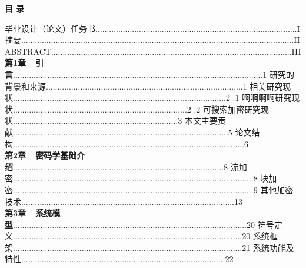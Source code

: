 \documentclass[a4paper,12pt,UTF8]{ctexart}
\begin{document}
\begin{spacing}{1.1}
\clearpage{}  %
%
\begin{center}
\Large\textbf{目  录}
\end{center}
\normalsize
\begin{spacing}{1.45}
\justifying  
\noindent 毕业设计（论文）任务书........................................................................................I
\\摘要.......................................................................................................................II
\\ABSTRACT.........................................................................................................III
\\\textbf{第1章\ \ 引  言}.............................................................................................................1
 研究的背景和来源......................................................................................1
 相关研究现状.............................................................................................2
\indent{}.1 啊啊啊啊研究现状............................................................................2
\indent{}.2 可搜索加密研究现状........................................................................3
 本文主要贡献..............................................................................................5
 论文结构.....................................................................................................6
\\\textbf{第2章\ \ 密码学基础介绍}............................................................................................8
 流加密.........................................................................................................8
 块加密.........................................................................................................9
 其他加密技术.............................................................................................13
 \\\textbf{第3章\ \ 系统模型}......................................................................................................20
 符号定义....................................................................................................20
 系统框架....................................................................................................21
 系统功能及特性.........................................................................................22

\end{spacing}
\end{spacing}
\end{document}
